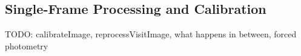 \subsection{Single-Frame Processing and Calibration}

TODO: calibrateImage, reprocessVisitImage, what happens in between, forced photometry

